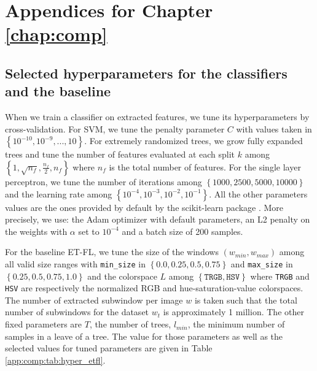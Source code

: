 

\chapter{Appendices for Chapter \ref{chap:comp}}
\label{app:comp}

\section{Selected hyperparameters for the classifiers and the baseline}
\label{app:comp:sec:selectedhyperparameters}

When we train a classifier on extracted features, we tune its hyperparameters by cross-validation. For SVM, we tune the penalty parameter $C$ with values taken in 
$\left\{10^{-10}, 10^{-9},...,10\right\}$. For extremely randomized trees, we grow fully expanded trees and tune the number of features evaluated at each split $k$ among $\left\{1, \sqrt{n_f}, \frac{n_f}{2}, n_f\right\}$ where 
$n_f$ is the total number of features. For the single layer perceptron, we tune the number of iterations among $\left\{1000, 2500, 5000, 10000\right\}$ and the learning rate among $\left\{10^{-4}, 10^{-3}, 10^{-2}, 10^{-1}\right\}$. All the other parameters values are the ones provided by default by the scikit-learn package \parencite{scikit-learn}. More precisely, we use: the Adam \parencite{kingma2014adam} optimizer with default parameters, an L2 penalty on the weights with $\alpha$ set to $10^{-4}$ and a batch size of 200 samples.

For the baseline ET-FL, we tune the size of the windows $\left(w_{min}, w_{max}\right)$ among all valid size ranges with \texttt{min\_size} in $\left\{0.0, 0.25, 0.5, 0.75\right\}$ and \texttt{max\_size} in $\left\{0.25, 0.5, 0.75, 1.0\right\}$ and the colorspace $L$ among $\left\{\texttt{TRGB}, \texttt{HSV}\right\}$ where \texttt{TRGB} and \texttt{HSV} are respectively the normalized RGB and hue-saturation-value colorspaces. The number of extracted subwindow per image $w$ is taken such that the total number of subwindows for the dataset $w_t$ is approximately 1 million. The other fixed parameters are $T$, the number of trees, $l_{min}$, the minimum number of samples in a leave of a tree. The value for those parameters as well as the selected values for tuned parameters are given in Table \ref{app:comp:tab:hyper_etfl}. 

